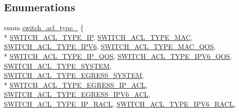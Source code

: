\subsection*{Enumerations}
\begin{DoxyCompactItemize}
\item 
enum \hyperlink{group__ACL_ga38651cb44573d362748840ec5c930d5a}{switch\+\_\+acl\+\_\+type\+\_\+} \{ \\*
\hyperlink{group__ACL_gga38651cb44573d362748840ec5c930d5aa6c4712b48f1b7ac5051cd36827dc4a87}{S\+W\+I\+T\+C\+H\+\_\+\+A\+C\+L\+\_\+\+T\+Y\+P\+E\+\_\+\+I\+P}, 
\hyperlink{group__ACL_gga38651cb44573d362748840ec5c930d5aa215a01cd3e3407ad84a8edcf7cf5a59c}{S\+W\+I\+T\+C\+H\+\_\+\+A\+C\+L\+\_\+\+T\+Y\+P\+E\+\_\+\+M\+A\+C}, 
\hyperlink{group__ACL_gga38651cb44573d362748840ec5c930d5aa18fea33ff06c5901c3dcbe54a561be1c}{S\+W\+I\+T\+C\+H\+\_\+\+A\+C\+L\+\_\+\+T\+Y\+P\+E\+\_\+\+I\+P\+V6}, 
\hyperlink{group__ACL_gga38651cb44573d362748840ec5c930d5aa295e3e1868e4721fe3f41516ea6f3f11}{S\+W\+I\+T\+C\+H\+\_\+\+A\+C\+L\+\_\+\+T\+Y\+P\+E\+\_\+\+M\+A\+C\+\_\+\+Q\+O\+S}, 
\\*
\hyperlink{group__ACL_gga38651cb44573d362748840ec5c930d5aa439336c290aef4a8c6f5739f835072b4}{S\+W\+I\+T\+C\+H\+\_\+\+A\+C\+L\+\_\+\+T\+Y\+P\+E\+\_\+\+I\+P\+\_\+\+Q\+O\+S}, 
\hyperlink{group__ACL_gga38651cb44573d362748840ec5c930d5aa9bbea73bd0708549389c7fe293ca737c}{S\+W\+I\+T\+C\+H\+\_\+\+A\+C\+L\+\_\+\+T\+Y\+P\+E\+\_\+\+I\+P\+V6\+\_\+\+Q\+O\+S}, 
\hyperlink{group__ACL_gga38651cb44573d362748840ec5c930d5aaa8e685a3b2ad272b31c4cf07cf41694b}{S\+W\+I\+T\+C\+H\+\_\+\+A\+C\+L\+\_\+\+T\+Y\+P\+E\+\_\+\+S\+Y\+S\+T\+E\+M}, 
\hyperlink{group__ACL_gga38651cb44573d362748840ec5c930d5aa4393bf6ff43550a0f9110ceee37805a7}{S\+W\+I\+T\+C\+H\+\_\+\+A\+C\+L\+\_\+\+T\+Y\+P\+E\+\_\+\+E\+G\+R\+E\+S\+S\+\_\+\+S\+Y\+S\+T\+E\+M}, 
\\*
\hyperlink{group__ACL_gga38651cb44573d362748840ec5c930d5aa94bc2a2fcf1e4c812b109ab7a6e847a0}{S\+W\+I\+T\+C\+H\+\_\+\+A\+C\+L\+\_\+\+T\+Y\+P\+E\+\_\+\+E\+G\+R\+E\+S\+S\+\_\+\+I\+P\+\_\+\+A\+C\+L}, 
\hyperlink{group__ACL_gga38651cb44573d362748840ec5c930d5aaa9fad4203e198b8e21d79ff8f19ae9b4}{S\+W\+I\+T\+C\+H\+\_\+\+A\+C\+L\+\_\+\+T\+Y\+P\+E\+\_\+\+E\+G\+R\+E\+S\+S\+\_\+\+I\+P\+V6\+\_\+\+A\+C\+L}, 
\hyperlink{group__ACL_gga38651cb44573d362748840ec5c930d5aa0b7321f870a3406d434552c6e9f2d180}{S\+W\+I\+T\+C\+H\+\_\+\+A\+C\+L\+\_\+\+T\+Y\+P\+E\+\_\+\+I\+P\+\_\+\+R\+A\+C\+L}, 
\hyperlink{group__ACL_gga38651cb44573d362748840ec5c930d5aa40b1217d8df168f9f72b3a0ca58ba91e}{S\+W\+I\+T\+C\+H\+\_\+\+A\+C\+L\+\_\+\+T\+Y\+P\+E\+\_\+\+I\+P\+V6\+\_\+\+R\+A\+C\+L}, 

\end{DoxyCompactItemize}
